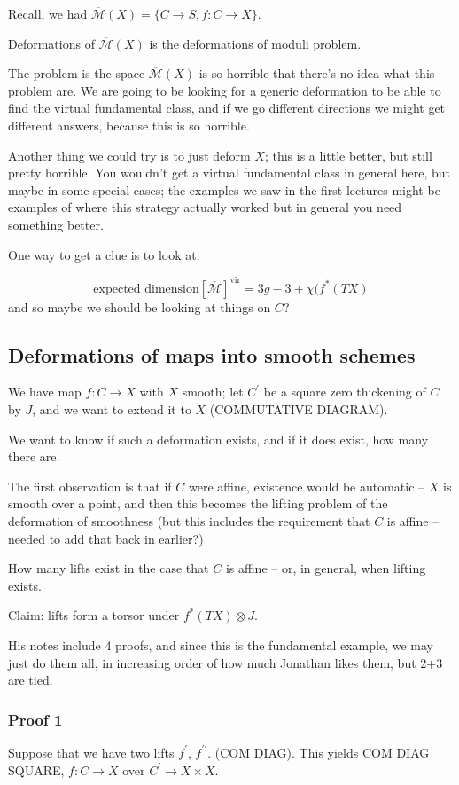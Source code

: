 \documentclass{amsart}
\theoremstyle{definition}
\newcommand{\Mbar}{\overline{\mathcal{M}}}
\newcommand{\vir}{\text{vir}}
\begin{document}
Recall, we had $\Mbar(X)=\{ C\to S, f:C\to X\}$.

Deformations of $\Mbar(X)$ is the deformations of moduli problem.

The problem is the space $\Mbar(X)$ is so horrible that there's no idea what this problem are.  We are going to be looking for a generic deformation to be able to find the virtual fundamental class, and if we go different directions we might get different answers, because this is so horrible.

Another thing we could try is to just deform $X$; this is a little better, but still pretty horrible.  You wouldn't get a virtual fundamental class in general here, but maybe in some special cases; the examples we saw in the first lectures might be examples of where this strategy actually worked but in general you need something better.

One way to get a clue is to look at:

$$\text{expected dimension} [\Mbar]^\vir=3g-3+\chi(f^*(TX)$$
and so maybe we should be looking at things on $C$?


\subsection{Deformations of maps into smooth schemes}
We have map $f:C\to X$ with $X$ smooth; let $C^\prime$ be a square zero thickening of $C$ by $J$, and we want to extend it to $X$ (COMMUTATIVE DIAGRAM).

We want to know if such a deformation exists, and if it does exist, how many there are.

The first observation is that if $C$ were affine, existence would be automatic -- $X$ is smooth over a point, and then this becomes the lifting problem of the deformation of smoothness (but this includes the requirement that $C$ is affine -- needed to add that back in earlier?)

How many lifts exist in the case that $C$ is affine -- or, in general, when lifting exists.

Claim: lifts form a torsor under $f^*(TX)\otimes J$.

His notes include 4 proofs, and since this is the fundamental example, we may just do them all, in increasing order of how much Jonathan likes them, but 2+3 are tied.

\subsubsection{Proof 1}
Suppose that we have two lifts $f^\prime$, $f^{\prime\prime}$. (COM DIAG).
This yields COM DIAG SQUARE, $f:C\to X$ over $C^\prime\to X\times X$.
\end{document}

